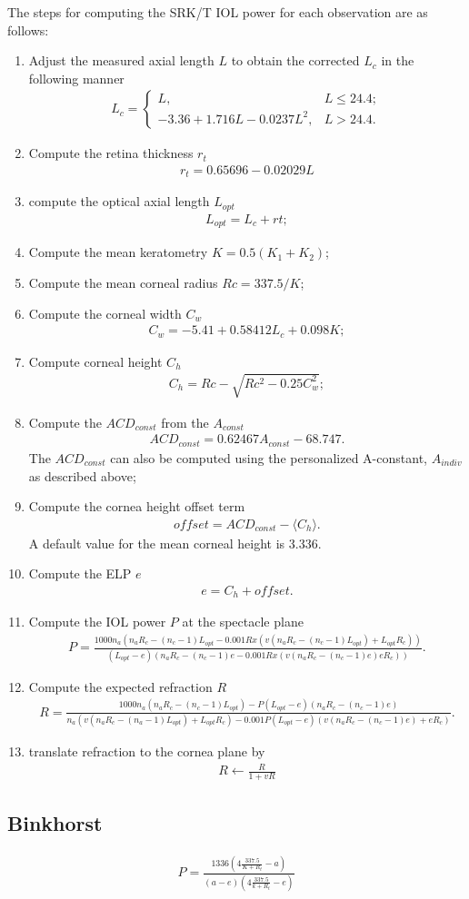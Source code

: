 \documentclass[article,twocolumn,preprint,10pt]{paper}%
\renewcommand{\(}{\left(}
\renewcommand{\)}{\right)}
\renewcommand{\[}{\left[}
\renewcommand{\]}{\right]}
\newcommand{\beq}{\begin{eqnarray}}
\newcommand{\eeq}{\end{eqnarray}}
\newcommand{\1}{\mbox{\boldmath$1$}}
\begin{document}
The steps for computing the SRK/T IOL power for each observation are as follows: 
\begin{enumerate} 
\item Adjust the measured axial length $L$ to obtain the corrected $L_c$ in the following manner 
\beq 
L_c = \begin{cases}
	L, & L\leq 24.4;\\
	-3.36+1.716L-0.0237L^2, & L>24.4.
\end{cases}
\eeq 
\item Compute the retina thickness $r_t$ 
\beq 
 r_t = 0.65696-0.02029L
\eeq 
\item compute the optical axial length $L_{opt}$
\beq 
 L_{opt} = L_c+rt;
\eeq 
\item Compute the mean keratometry $K = 0.5(K_1+K_2)$;
\item Compute the mean corneal radius $Rc = 337.5/K$;
\item Compute the corneal width $C_w$ 
\beq 
C_w = -5.41+0.58412L_c+0.098K;
\eeq 
\item Compute corneal height $C_h$
\beq 
 C_h = Rc-\sqrt{Rc^2- 0.25C_w^2};
\eeq 
\item Compute the $ACD_{const}$ from the $A_{const}$
\beq 
 ACD_{const} = 0.62467A_{const}-68.747.
\eeq 
The $ACD_{const}$ can also be computed using the personalized A-constant, $A_{indiv}$ as described above; 
\item Compute the cornea height offset term 
\beq 
offset = ACD_{const}-\langle C_h\rangle. 
\eeq 
A default value for the mean corneal height is 3.336.
\item Compute the ELP $e$
\beq 
e = C_h+offset.
\eeq 
\item Compute the IOL power $P$ at the spectacle plane 
\beq 
 P = \frac{1000n_a(n_aR_c-(n_c-1)L_{opt}-0.001Rx(v(n_aR_c-(n_c-1)L_{opt})+L_{opt}R_c))}{(L_{opt}-e)(n_aR_c-(n_c-1)e-0.001Rx(v(n_aR_c-(n_c-1)e)eR_c))}.
\eeq 
\item Compute the expected refraction $R$
\beq 
R = \frac{1000n_a(n_aR_c-(n_c-1)L_{opt})-P(L_{opt}-e)(n_aR_c-(n_c-1)e)}{n_a(v(n_aR_c-(n_a-1)L_{opt})+L_{opt}R_c)-0.001P(L_{opt}-e)(v(n_aR_c-(n_c-1)e)+eR_c) }.
\eeq 
\item translate refraction to the cornea plane by
\beq 
R \leftarrow \frac{R}{1+vR}
\eeq  

\end{enumerate}


\subsection{Binkhorst}\label{subsection:Binkhorst}
\beq 
P = \frac{1336(4\frac{337.5}{K+R_t}-a)}{(a-e)\left(4\frac{337.5}{k+R_t}-e\right)}
\eeq 
\end{document}
